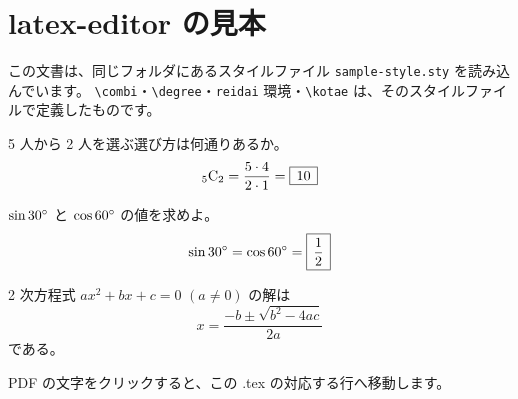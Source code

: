 \documentclass[a4paper]{ltjsarticle}
\begin{document}
\section*{latex-editor の見本}

この文書は、同じフォルダにあるスタイルファイル \texttt{sample-style.sty} を読み込んでいます。
\verb|\combi|・\verb|\degree|・\verb|reidai| 環境・\verb|\kotae| は、そのスタイルファイルで定義したものです。

\begin{reidai}
5 人から 2 人を選ぶ選び方は何通りあるか。
\[
  {}_{5}\mathrm{C}_{2} = \frac{5 \cdot 4}{2 \cdot 1} = \fbox{\,10\,}
\]
\end{reidai}

\begin{reidai}
$\sin 30^{\circ}$ と $\cos 60^{\circ}$ の値を求めよ。
\[
  \sin 30^{\circ} = \cos 60^{\circ} = \fbox{\,$\dfrac{1}{2}$\,}
\]
\end{reidai}

\begin{reidai}
2 次方程式 $ax^2 + bx + c = 0$ $(a \neq 0)$ の解は
\[
  x = \frac{-b \pm \sqrt{b^2 - 4ac}}{2a}
\]
である。
\end{reidai}

PDF の文字をクリックすると、この .tex の対応する行へ移動します。
\end{document}

